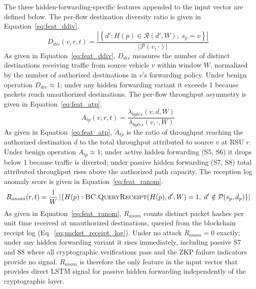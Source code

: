 \documentclass[12pt, a4paper]{report}
\begin{document}
The three hidden-forwarding-specific features appended
to the input vector are defined below. The per-flow
destination diversity ratio is given in
Equation~\eqref{eq:feat_ddiv}.
\begin{equation}
D_{div}(v,r,t) =
\frac{\left|\left\{
d' : H(p) \in \mathcal{R}(d',W),\;
s_p = v
\right\}\right|}{|\mathcal{P}(v,\cdot)|}
\label{eq:feat_ddiv}
\end{equation}
As given in Equation~\eqref{eq:feat_ddiv},
$D_{div}$ measures the number of distinct
destinations receiving traffic from source vehicle
$v$ within window $W$, normalized by the number of
authorized destinations in $v$'s forwarding policy.
Under benign operation $D_{div}{\approx}1$; under any
hidden forwarding variant it exceeds 1 because packets
reach unauthorized destinations. The per-flow
throughput asymmetry is given in
Equation~\eqref{eq:feat_atp}.
\begin{equation}
A_{tp}(v,r,t) =
\frac{\lambda_{bytes}(v,d,W)}
{\lambda_{bytes}(v,\cdot,W)}
\label{eq:feat_atp}
\end{equation}
As given in Equation~\eqref{eq:feat_atp},
$A_{tp}$ is the ratio of throughput reaching the
authorized destination $d$ to the total throughput
attributed to source $v$ at \ac{RSU} $r$. Under
benign operation $A_{tp}{\approx}1$; under active
hidden forwarding (S5, S6) it drops below 1 because
traffic is diverted; under passive hidden forwarding
(S7, S8) total attributed throughput rises above the
authorized path capacity. The reception log anomaly
score is given in Equation~\eqref{eq:feat_ranom}.
\begin{equation}
R_{anom}(r,t) =
\frac{1}{W}\left|\left\{
H(p) :
\textsc{BC.QueryReceipt}(H(p),d',W) = 1,\;
d' \notin \mathcal{P}(s_p, d_p)
\right\}\right|
\label{eq:feat_ranom}
\end{equation}
As given in Equation~\eqref{eq:feat_ranom},
$R_{anom}$ counts distinct packet hashes per unit
time received at unauthorized destinations, queried
from the blockchain receipt log
(Eq.~\ref{eq:packet_receipt_log}). Under no attack
$R_{anom}{=}0$ exactly; under any hidden forwarding
variant it rises immediately, including passive S7
and S8 where all cryptographic verifications pass
and the \ac{ZKP} failure indicators provide no
signal. $R_{anom}$ is therefore the only feature in
the input vector that provides direct LSTM signal
for passive hidden forwarding independently of the
cryptographic layer.
\end{document}
